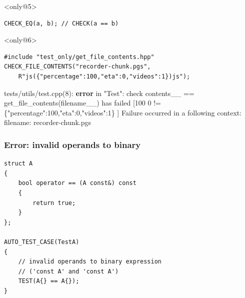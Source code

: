 \documentclass{beamer}
\begin{document}
\begin{frame}[fragile]
\begin{exampleblock}{}<only@5>
\begin{lstlisting}
CHECK_EQ(a, b); // CHECK(a == b)
\end{lstlisting}
\end{exampleblock}

\begin{exampleblock}{}<only@6>
\begin{lstlisting}
#include "test_only/get_file_contents.hpp"
CHECK_FILE_CONTENTS("recorder-chunk.pgs",
    R"js({"percentage":100,"eta":0,"videos":1})js");
\end{lstlisting}
{\color{f7}tests/utils/test.cpp(8)}: \textbf{\color{f1}error} in "{\color{f5}Test}":
 {\color{f4}check contents\_\_ == get\_file\_contents(filename\_\_) has failed [100 0 != \{"percentage":100,"eta":0,"videos":1\} ]} \newline
Failure occurred in a following context: \newline
    filename: recorder-chunk.pgs
\end{exampleblock}
\end{frame}


\begin{frame}[fragile]
\frametitle{Error: invalid operands to binary}
\begin{lstlisting}
struct A
{
    bool operator == (A const&) const
    {
        return true;
    }
};

AUTO_TEST_CASE(TestA)
{
    // invalid operands to binary expression
    // ('const A' and 'const A')
    TEST(A{} == A{});
}
\end{lstlisting}
\end{frame}
\end{document}
